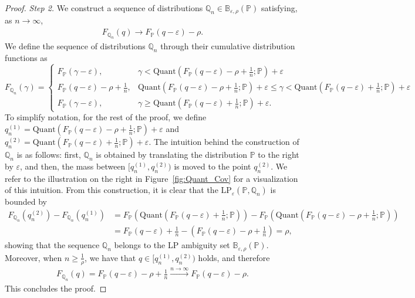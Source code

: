 \documentclass[11pt,a4paper]{article}
\begin{document}
\begin{proof}
\medskip

\noindent\emph{Step 2.} We construct a sequence of distributions $\mathbb Q_n \in \mathbb{B}_{\varepsilon, \rho}(\mathbb P)$ satisfying, as $n \to \infty$,
\begin{align*}
    F_{\mathbb Q_n}(q) \to F_{\mathbb P}(q - \varepsilon) - \rho.
\end{align*}
We define the sequence of distributions $\mathbb Q_n$ through their cumulative distribution functions as
\begin{equation*}
        F_{\mathbb Q_n}(\gamma) = \begin{cases}
        F_\mathbb{P}(\gamma-\varepsilon), & \gamma<\text{Quant}\left(F_\mathbb{P}(q-\varepsilon)-\rho+\frac{1}{n}; \mathbb P \right)+\varepsilon\\
        F_\mathbb{P}(q-\varepsilon)-\rho+\frac{1}{n}, & \text{Quant} \left(F_\mathbb{P}(q-\varepsilon)-\rho+\frac{1}{n};\mathbb P \right)+\varepsilon\leq \gamma <  \text{Quant} \left(F_\mathbb{P}(q-\varepsilon)+\frac{1}{n};\mathbb P \right)+\varepsilon\\
        F_\mathbb{P}(\gamma-\varepsilon), & \gamma \geq \text{Quant} \left(F_\mathbb{P}(q-\varepsilon)+\frac{1}{n};\mathbb P \right)+\varepsilon.
        \end{cases}
    \end{equation*}
To simplify notation, for the rest of the proof, we define $q^{(1)}_n = \text{Quant}(F_{\mathbb P}(q-\varepsilon)-\rho+\frac{1}{n}; \mathbb P)+\varepsilon$ and $q^{(2)}_n = \text{Quant}(F_{\mathbb P}(q-\varepsilon)+\frac{1}{n}; \mathbb P)+\varepsilon$.  The intuition behind the construction of $\mathbb Q_n$ is as follows: first, $\mathbb{Q}_n$ is obtained by translating the distribution $\mathbb P$ to the right by $\varepsilon$, and then, the mass between $[q^{(1)}_n,q^{(2)}_n)$ is moved to the point $q^{(2)}_n$. We refer to the illustration on the right in Figure~\ref{fig:Quant_Cov} for a visualization of this intuition. From this construction, it is clear that the $\text{LP}_\varepsilon(\mathbb P, \mathbb{Q}_n)$ is bounded by
\begin{align*}
    F_{\mathbb{Q}_n} \left(q^{(2)}_n \right)-F_{\mathbb{Q}_n} \left(q^{(1)}_n \right) &= F_{\mathbb P}\left(\text{Quant} \left(F_{\mathbb P}(q-\varepsilon)+\frac{1}{n}; \mathbb P \right) \right) - F_{\mathbb P} \left( \text{Quant} \left(F_{\mathbb P}(q-\varepsilon)-\rho+\frac{1}{n}; \mathbb P \right) \right)
    \\ &= F_{\mathbb P}(q-\varepsilon)+\frac{1}{n} - \left( F_{\mathbb P}(q-\varepsilon)-\rho+\frac{1}{n} \right) = \rho,
\end{align*}
showing that the sequence $\mathbb Q_n$ belongs to the LP ambiguity set $\mathbb{B}_{\varepsilon, \rho}(\mathbb P)$. Moreover, when $n\geq\frac{1}{\rho}$, we have that $q\in[q^{(1)}_n, q^{(2)}_n)$ holds, and therefore
\begin{align*}
    F_{\mathbb Q_n}(q) = F_{\mathbb P}(q-\varepsilon)-\rho+\frac{1}{n} \stackrel{n\rightarrow\infty}{\longrightarrow} F_{\mathbb P}(q-\varepsilon)-\rho.
\end{align*}
This concludes the proof.
\end{proof}
\end{document}
